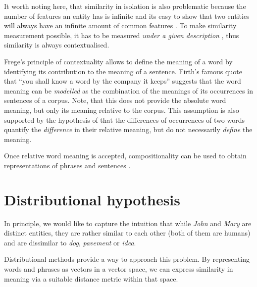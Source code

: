 It worth noting here, that similarity in isolation is also problematic because the number of features an entity has is infinite and its easy to show that two entities will always have an infinite amount of common features \cite{goodman1972problems,hahn1997concepts}. To make similarity measurement possible, it has to be measured \emph{under a given description} \cite{WCS:WCS1282,medin1993respects,Markman1996}, thus similarity is always contextualised.

Frege's principle of contextuality allows to define the meaning of a word by identifying its contribution to the meaning of a sentence. Firth's \citeyearpar{firth1957lingtheory} famous quote that ``you shall know a word by the company it keeps''  suggests that the word meaning can be \emph{modelled} as the combination of the meanings of its occurrences in sentences of a corpus. Note, that this does not provide the absolute word meaning, but only its meaning relative to the corpus. This assumption is also supported by the hypothesis of  that the differences of occurrences of two words quantify the \emph{difference} in their relative meaning, but do not necessarily \emph{define} the meaning.

Once relative word meaning is accepted, compositionality can be used to obtain representations of phrases and sentences \cite{THEO:THEO373,Dowty1980,sep-montague-semantics,DBLP:journals/corr/abs-1003-4394,baroni2014frege}.

\section{Distributional hypothesis}
\label{sec:distr-hypoth}

In principle, we would like to capture the intuition that while \textit{John} and \textit{Mary} are distinct entities, they are rather similar to each other (both of them are humans) and are dissimilar to \textit{dog}, \textit{pavement} or \textit{idea}.


Distributional methods provide a way to approach this problem. By representing words and phrases as vectors in a vector space, we can express similarity in meaning via a suitable distance metric within that space.

